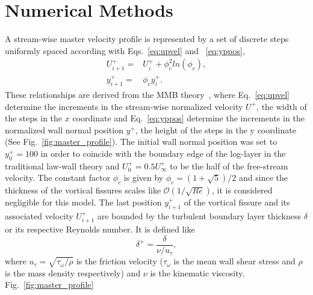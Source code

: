 \documentclass[aps,reprint,amsmath,amssymb,prl]{revtex4-1}%
\begin{document}
\maketitle
\section{Numerical Methods}
A stream-wise master velocity profile is represented by a set of discrete steps uniformly spaced according with Eqs.~\ref{eq:upvel} and ~\ref{eq:yppos}, 
\begin{align}
U^+_{i+1}=&U^+_i+\phi_c^2 ln(\phi_c) \label{eq:upvel},\\
y^+_{i+1}=&\phi_c y^+_i \label{eq:yppos}.
\end{align}
These relationships are  derived from the MMB theory~\citep{Klewickimmb}, where Eq.~\ref{eq:upvel} determine the increments in the stream-wise normalized velocity $U^+$, the width of the steps in the $x$ coordinate and
Eq.~\ref{eq:yppos} determine the increments in the normalized wall normal position $y^+$, the height of the steps in the y coordinate (See Fig.~\ref{fig:master_profile}). The initial wall normal position was set to $y^+_0=100$ in order to coincide with the boundary edge of the log-layer in the traditional law-wall theory and $U^+_0=0.5 U_{\infty}^+$ to be the half of the free-stream velocity. The constant factor $\phi_c$ is given by $\phi_c=(1+\sqrt{5})/2$ and since the thickness of the
vortical fissures scales like $\mathcal{O}(1/\sqrt{Re})$, it is considered negligible for this model.  The last position $y_{i+1}^+$ of the vortical fissure and its associated velocity $U^+_{i+1}$ are bounded by the turbulent boundary layer thickness $\delta$ or its respective Reynolds number. It is defined like 
\begin{equation}\label{eq:deltap}
\delta^+=\frac{\delta}{\nu/u_{\tau}},
\end{equation}
where $u_{\tau}=\sqrt{\tau_{\omega}/\rho}$ is the friction velocity ($\tau_{\omega}$ is the mean wall shear stress and $\rho$ is the mass density respectively) and $\nu$ is the kinematic viscosity. 
Fig.~\ref{fig:master_profile} 
\end{document}
